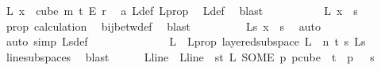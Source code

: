 \begin{isabellebody}
\ {\isachardoublequoteopen}{\isasymchi}L\ x\ {\isasymin}\ {\isacharparenleft}{\kern0pt}cube\ m\ {\isacharparenleft}{\kern0pt}t{\isacharplus}{\kern0pt}{}{\isacharparenright}{\kern0pt}\ {\isasymrightarrow}\isactrlsub E\ {\isacharbraceleft}{\kern0pt}{\isachardot}{\kern0pt}{\isachardot}{\kern0pt}{\isacharless}{\kern0pt}r{\isacharbraceright}{\kern0pt}{\isacharparenright}{\kern0pt}{\isachardoublequoteclose}\ \isamarkupfalse%
\ a\ {\isasymchi}L{\isacharunderscore}{\kern0pt}def\ {\isasymchi}L{\isacharunderscore}{\kern0pt}prop\ \isamarkupfalse%
\ {\isasymchi}L{\isacharunderscore}{\kern0pt}def\ \isamarkupfalse%
\ blast\isanewline
\ \ \ \ \ \ \isamarkupfalse%
\ \isamarkupfalse%
\ {\isachardoublequoteopen}{\isasymphi}\ {\isacharparenleft}{\kern0pt}{\isasymchi}L\ x{\isacharparenright}{\kern0pt}\ {\isasymin}\ {\isacharbraceleft}{\kern0pt}{\isachardot}{\kern0pt}{\isachardot}{\kern0pt}{\isacharless}{\kern0pt}s{\isacharbraceright}{\kern0pt}{\isachardoublequoteclose}\ \isamarkupfalse%
\ {\isasymphi}{\isacharunderscore}{\kern0pt}prop\ calculation{\isacharparenleft}{\kern0pt}{}{\isacharparenright}{\kern0pt}\ \isamarkupfalse%
\ bij{\isacharunderscore}{\kern0pt}betw{\isacharunderscore}{\kern0pt}def\ \isamarkupfalse%
\ blast\isanewline
\ \ \ \ \ \ \isamarkupfalse%
\ \isamarkupfalse%
\ {\isachardoublequoteopen}{\isasymchi}L{\isacharunderscore}{\kern0pt}s\ x\ {\isasymin}\ {\isacharbraceleft}{\kern0pt}{\isachardot}{\kern0pt}{\isachardot}{\kern0pt}{\isacharless}{\kern0pt}s{\isacharbraceright}{\kern0pt}{\isachardoublequoteclose}\ \isamarkupfalse%
\ auto\isanewline
\ \ \ \ \isamarkupfalse%
\ {\isacharparenleft}{\kern0pt}auto\ simp{\isacharcolon}{\kern0pt}\ {\isasymchi}L{\isacharunderscore}{\kern0pt}s{\isacharunderscore}{\kern0pt}def{\isacharparenright}{\kern0pt}\isanewline
\ \ \ \ \ \ \isanewline
\ \ \ \ \isamarkupfalse%
\ \isamarkupfalse%
\ L\ \ L{\isacharunderscore}{\kern0pt}prop{\isacharcolon}{\kern0pt}\ {\isachardoublequoteopen}layered{\isacharunderscore}{\kern0pt}subspace\ L\ {}\ n\ t\ s\ {\isasymchi}L{\isacharunderscore}{\kern0pt}s{\isachardoublequoteclose}\ \isamarkupfalse%
\ line{\isacharunderscore}{\kern0pt}subspace{\isacharunderscore}{\kern0pt}s\ \isamarkupfalse%
\ blast\isanewline
\ \ \ \ \isamarkupfalse%
\ L{\isacharunderscore}{\kern0pt}line\ \ {\isachardoublequoteopen}L{\isacharunderscore}{\kern0pt}line\ {\isasymequiv}\ {\isacharparenleft}{\kern0pt}{\isasymlambda}s{\isasymin}{\isacharbraceleft}{\kern0pt}{\isachardot}{\kern0pt}{\isachardot}{\kern0pt}{\isacharless}{\kern0pt}t{\isacharplus}{\kern0pt}{}{\isacharbraceright}{\kern0pt}{\isachardot}{\kern0pt}\ L\ {\isacharparenleft}{\kern0pt}SOME\ p{\isachardot}{\kern0pt}\ p{\isasymin}cube\ {}\ {\isacharparenleft}{\kern0pt}t{\isacharplus}{\kern0pt}{}{\isacharparenright}{\kern0pt}\ {\isasymand}\ p\ {}\ {\isacharequal}{\kern0pt}\ s{\isacharparenright}{\kern0pt}{\isacharparenright}{\kern0pt}{\isachardoublequoteclose}\isanewline

\end{isabellebody}
